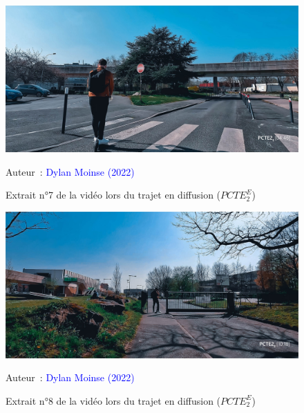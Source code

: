     \begin{figure}[h!]\vspace*{4pt}
        \caption*{Extrait n°7 de la vidéo lors du trajet en diffusion (\(PCTE^{E}_{2}\))}
        \centerline{\includegraphics[width=0.75\columnwidth]{src/Figures/Annexes/Extrait_Video_PCTE2_Egress_7.jpg}}
        \vspace{5pt}
        \begin{flushright}\scriptsize{
        Auteur~: \textcolor{blue}{Dylan Moinse (2022)}
        }\end{flushright}
    \end{figure}

    \begin{figure}[h!]\vspace*{4pt}
        \caption*{Extrait n°8 de la vidéo lors du trajet en diffusion (\(PCTE^{E}_{2}\))}
        \centerline{\includegraphics[width=0.75\columnwidth]{src/Figures/Annexes/Extrait_Video_PCTE2_Egress_8.jpg}}
        \vspace{5pt}
        \begin{flushright}\scriptsize{
        Auteur~: \textcolor{blue}{Dylan Moinse (2022)}
        }\end{flushright}
    \end{figure}

